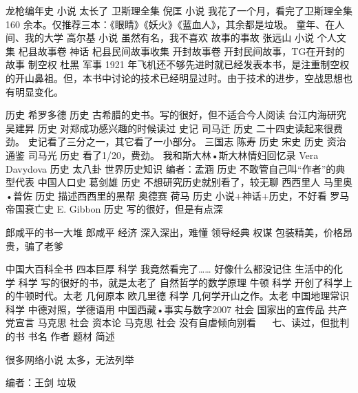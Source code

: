 龙枪编年史		小说	太长了
卫斯理全集	倪匡	小说	我花了一个月，看完了卫斯理全集160 余本。仅推荐三本：《眼睛》《妖火》《蓝血人》，其余都是垃圾。
童年、在人间、我的大学	高尔基	小说	虽然有名，我不喜欢
故事的事故	张远山	小说	个人文集
杞县故事卷		神话	杞县民间故事收集
开封故事卷			开封民间故事，TG在开封的故事
制空权	杜黑	军事	1921 年飞机还不够先进时就已经发表本书，是注重制空权的开山鼻祖。但，本书中讨论的技术已经明显过时。由于技术的进步，空战思想也有明显变化。
			
历史	希罗多德	历史	古希腊的史书。写的很好，但不适合今人阅读
台江内海研究	吴建昇	历史	对郑成功感兴趣的时候读过
史记	司马迁	历史	二十四史读起来很费劲。
史记看了三分之一，其它看了一小部分。
三国志	陈寿	历史	
宋史		历史	
资治通鉴	司马光	历史	看了1/20，费劲。
我和斯大林•斯大林情妇回忆录	Vera Davydova	历史	太八卦
世界历史知识	编者：孟涵	历史	不敢管自己叫“作者”的典型代表
中国人口史	葛剑雄	历史	不想研究历史就别看了，较无聊
西西里人	马里奥•普佐	历史	描述西西里的黑帮
奥德赛	荷马	历史	小说+神话+历史，不好看
罗马帝国衰亡史	E. Gibbon	历史	写的很好，但是有点深

郎咸平的书一大堆	郎咸平	经济	深入深出，难懂
领导经典		权谋	包装精美，价格昂贵，骗了老爹


中国大百科全书	四本巨厚	科学	我竟然看完了……
好像什么都没记住
生活中的化学		科学	写的很好的书，就是太老了
自然哲学的数学原理	牛顿	科学	开创了科学上的牛顿时代。太老
几何原本	欧几里德	科学	几何学开山之作。太老
中国地理常识		科学	中德对照，学德语用
中国西藏•事实与数字2007		社会	国家出的宣传品
共产党宣言	马克思	社会	
资本论	马克思	社会	没有自虐倾向别看
 
七、读过，但批判的书
书名	作者	题材	简述


很多网络小说			太多，无法列举

编者：王剑		垃圾




